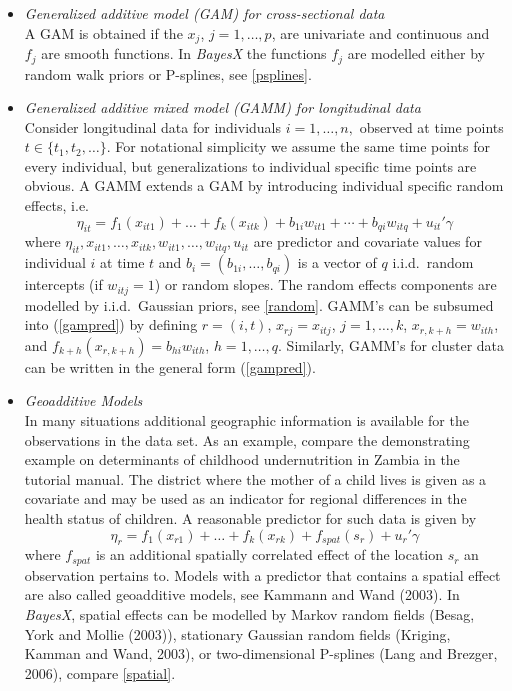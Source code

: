 \documentclass[11pt,a4paper,twoside]{bayesxarticle}
\begin{document}
\begin{itemize}
\item {\em Generalized additive model (GAM) for cross-sectional data} \\
A GAM is obtained if  the $x_j$, $j=1,\dots,p$, are univariate and
continuous and $f_j$ are smooth functions. In {\em BayesX} the
functions $f_j$ are modelled either by random walk priors or
P-splines, see \autoref{psplines}.

\item {\em Generalized additive mixed model (GAMM) for longitudinal data} \\
Consider longitudinal data for individuals $i=1,\dots,n,$ observed
at time points $t \in \{ t_1,t_2,\dots \}$. For notational
simplicity we assume the same time points for every individual,
but generalizations to individual specific time points are
obvious. A GAMM extends a GAM by introducing individual specific
random effects, i.e.
$$
\eta_{it} = f_1(x_{it1})+\dots+f_k(x_{itk}) + b_{1i} w_{it1}  +
\cdots + b_{qi} w_{itq}  + u_{it}'\gamma
$$
where $\eta_{it},x_{it1},\dots,x_{itk},w_{it1},\dots,w_{itq},u_{it}$
are predictor and covariate values for individual $i$ at time $t$
and $b_i=(b_{1i},\dots,b_{qi})$ is a vector of $q$ i.i.d.~random
intercepts (if $w_{itj} = 1$) or random slopes. The random effects
components are modelled by i.i.d.~Gaussian priors, see
\autoref{random}. GAMM's can be subsumed into (\ref{gampred}) by
defining $r=(i,t)$, $x_{rj} = x_{itj}$, $j=1,\dots,k$, $x_{r,k+h} =
w_{ith}$, and $f_{k+h}(x_{r,k+h}) = b_{hi} w_{ith}$, $h=1,\dots,q$.
Similarly, GAMM's for cluster data can be written in the general
form (\ref{gampred}).

\item {\em Geoadditive Models} \\
In many situations additional geographic information is available
for the observations in the data set. As an example, compare the
demonstrating example on determinants of childhood undernutrition in
Zambia in the tutorial manual. The district where the mother of a
child lives is given as a covariate and may be used as an indicator
for regional differences in the health status of children. A
reasonable predictor for such data is given by
\begin{equation}
\eta_{r} = f_1(x_{r1})+\dots+f_k(x_{rk}) + f_{spat}(s_{r}) + u_r'
\gamma
\end{equation}
where $f_{spat}$ is an additional spatially correlated effect of the
location $s_{r}$ an observation pertains to. Models with a predictor
that contains a spatial effect are also called geoadditive models,
see Kammann and Wand (2003). In {\em BayesX}, spatial effects can be
modelled by Markov random fields (Besag, York and Mollie (2003)),
stationary Gaussian random fields (Kriging, Kamman and Wand, 2003),
or two-dimensional P-splines (Lang and Brezger, 2006), compare
\autoref{spatial}.


\end{itemize}
\end{document}
